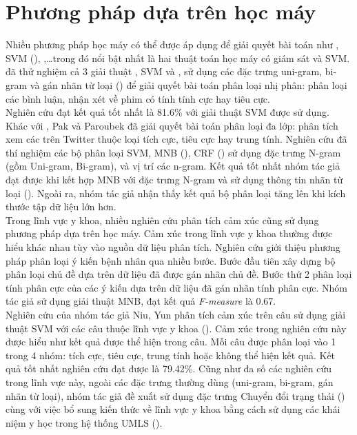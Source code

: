 \section{Phương pháp dựa trên học máy}
Nhiều phương pháp học máy có thể được áp dụng để giải quyết bài toán như , SVM (), ,\ldots trong đó nổi bật nhất là hai thuật toán học máy có giám sát  và SVM. \cite{pang2002thumbs} đã thử nghiệm cả 3 giải thuật , SVM và , sử dụng các đặc trưng uni-gram, bi-gram và gán nhãn từ loại () để giải quyết bài toán phân loại nhị phân: phân loại các bình luận, nhận xét về phim có tính tính cực hay tiêu cực. \\

Nghiên cứu đạt kết quả tốt nhất là 81.6\% với giải thuật SVM được sử dụng. Khác với \cite{pang2002thumbs}, Pak và Paroubek \cite{Zhang2015} đã giải quyết bài toán phân loại đa lớp: phân tích xem các  trên Twitter thuộc loại tích cực, tiêu cực hay trung tính. Nghiên cứu đã thí nghiệm các bộ phân loại SVM, MNB (), CRF () sử dụng đặc trưng N-gram (gồm Uni-gram, Bi-gram), và vị trí các n-gram. Kết quả tốt nhất nhóm tác giả đạt được khi kết hợp MNB với đặc trưng N-gram và sử dụng thông tin nhãn từ loại (). Ngoài ra, nhóm tác giả nhận thấy kết quả bộ phân loại tăng lên khi kích thước tập dữ liệu lớn hơn.\\

Trong lĩnh vực y khoa, nhiều nghiên cứu phân tích cảm xúc cũng sử dụng phương pháp dựa trên học máy. Cảm xúc trong lĩnh vực y khoa thường được hiểu khác nhau tùy vào nguồn dữ liệu phân tích.
Nghiên cứu \cite{xia09improving} giới thiệu phương pháp phân loại ý kiến bệnh nhân qua nhiều bước. Bước đầu tiên xây dựng bộ phân loại chủ đề dựa trên dữ liệu đã được gán nhãn chủ đề. Bước thứ 2 phân loại tính phân cực của các ý kiến dựa trên dữ liệu đã gán nhãn tính phân cực. Nhóm tác giả sử dụng giải thuật MNB, đạt kết quả \textit{F-measure} là 0.67.\\

Nghiên cứu của nhóm tác giả Niu, Yun \cite{niu2005analysis} phân tích cảm xúc trên câu sử dụng giải thuật SVM với các câu thuộc lĩnh vực y khoa (). Cảm xúc trong nghiên cứu này được hiểu như kết quả  được thể hiện trong câu. Mỗi câu được phân loại vào 1 trong 4 nhóm: tích cực, tiêu cực, trung tính hoặc không thể hiện kết quả. Kết quả tốt nhất nghiên cứu đạt được là 79.42\%. Cũng như đa số các nghiên cứu trong lĩnh vực này, ngoài các đặc trưng thường dùng (uni-gram, bi-gram, gán nhãn từ loại), nhóm tác giả đề xuất sử dụng đặc trưng Chuyển đổi trạng thái () cùng với việc bổ sung kiến thức về lĩnh vực y khoa bằng cách sử dụng các khái niệm y học trong hệ thống UMLS (). 
